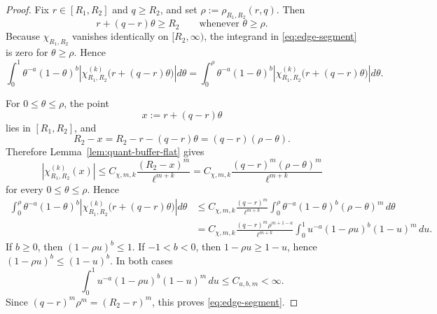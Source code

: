 \documentclass[11pt,a4paper]{amsart}
\theoremstyle{plain}
\theoremstyle{definition}
\theoremstyle{remark}
\begin{document}
\begin{proof}
Fix \(r\in[R_1,R_2]\) and \(q\ge R_2\), and set \(\rho:=\rho_{R_1,R_2}(r,q)\). Then
\[
r+(q-r)\theta\ge R_2
\qquad\text{whenever }\theta\ge \rho.
\]
Because \(\chi_{R_1,R_2}\) vanishes identically on \([R_2,\infty)\), the integrand in
\eqref{eq:edge-segment} is zero for \(\theta\ge \rho\). Hence
\[
\int_0^1
\theta^{-a}(1-\theta)^b
\left|
\chi_{R_1,R_2}^{(k)}\!\bigl(r+(q-r)\theta\bigr)
\right|
d\theta
=
\int_0^\rho
\theta^{-a}(1-\theta)^b
\left|
\chi_{R_1,R_2}^{(k)}\!\bigl(r+(q-r)\theta\bigr)
\right|
d\theta.
\]

For \(0\le\theta\le \rho\), the point
\[
x:=r+(q-r)\theta
\]
lies in \([R_1,R_2]\), and
\[
R_2-x
=
R_2-r-(q-r)\theta
=
(q-r)(\rho-\theta).
\]
Therefore Lemma~\ref{lem:quant-buffer-flat} gives
\[
\left|
\chi_{R_1,R_2}^{(k)}(x)
\right|
\le
C_{\chi,m,k}
\frac{(R_2-x)^m}{\ell^{m+k}}
=
C_{\chi,m,k}
\frac{(q-r)^m(\rho-\theta)^m}{\ell^{m+k}}
\]
for every \(0\le\theta\le \rho\). Hence
\begin{align*}
\int_0^\rho
\theta^{-a}(1-\theta)^b
\left|
\chi_{R_1,R_2}^{(k)}\!\bigl(r+(q-r)\theta\bigr)
\right|
d\theta
&\le
C_{\chi,m,k}\frac{(q-r)^m}{\ell^{m+k}}
\int_0^\rho
\theta^{-a}(1-\theta)^b(\rho-\theta)^m\,d\theta\\
&=
C_{\chi,m,k}\frac{(q-r)^m\rho^{m+1-a}}{\ell^{m+k}}
\int_0^1
u^{-a}(1-\rho u)^b(1-u)^m\,du.
\end{align*}
If \(b\ge0\), then \((1-\rho u)^b\le1\). If \(-1<b<0\), then \(1-\rho u\ge1-u\), hence
\((1-\rho u)^b\le(1-u)^b\). In both cases
\[
\int_0^1
u^{-a}(1-\rho u)^b(1-u)^m\,du
\le
C_{a,b,m}<\infty.
\]
Since \((q-r)^m\rho^m=(R_2-r)^m\), this proves \eqref{eq:edge-segment}.
\end{proof}
\end{document}
